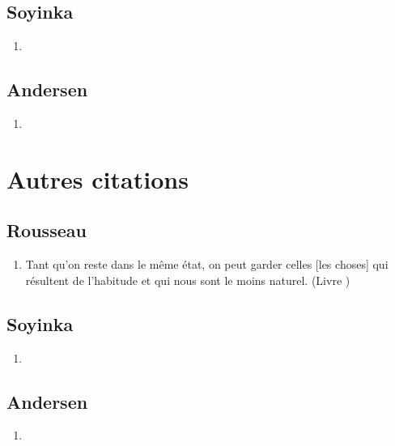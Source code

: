 \documentclass[a4paper, 11pt, hidelinks]{article}
\newcommand{\rb}[1]{\Romanbar{#1}}
\begin{document}
\subsection{Soyinka}


\begin{enumerate}
    \item 
\end{enumerate}




\subsection{Andersen}


\begin{enumerate}
    \item 
\end{enumerate}







\section{Autres citations}





\subsection{Rousseau}


\begin{enumerate}
    \item Tant qu'on reste dans le même état, on peut garder celles [les choses] qui résultent de l'habitude et qui nous sont le moins naturel. (Livre \rb{1})
\end{enumerate}



\subsection{Soyinka}


\begin{enumerate}
    \item 
\end{enumerate}




\subsection{Andersen}


\begin{enumerate}
    \item 
\end{enumerate}
\end{document}
